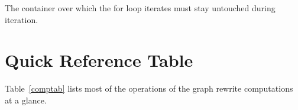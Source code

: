 \begin{warning}
The container over which the for loop iterates must stay untouched during iteration.
\end{warning}


\section{Quick Reference Table}

Table~\ref{comptab} lists most of the operations of the graph rewrite computations at a glance.

